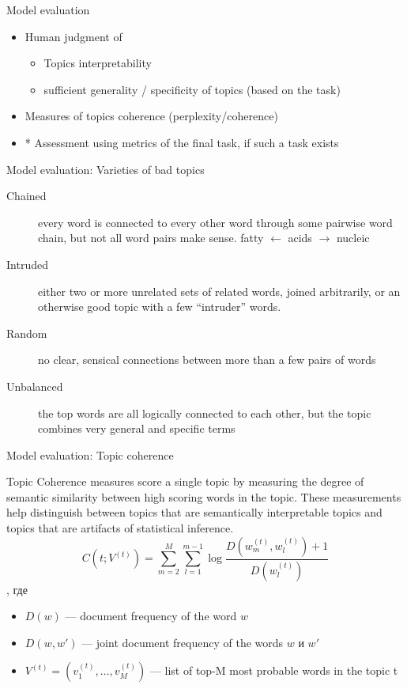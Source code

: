 \documentclass[svgnames]{beamer}
\begin{document}
\begin{frame}{Model evaluation}
\begin{itemize}
\item Human judgment of
\begin{itemize}
\item Topics interpretability
\item sufficient generality / specificity of topics (based on the task)
\end{itemize}
\item Measures of topics coherence (perplexity/coherence)
\item * Assessment using metrics of the final task, if such a task exists
\end{itemize}

\end{frame}

\begin{frame}{Model evaluation: Varieties of bad topics}
\begin{description}
\item[Chained] every word is connected to every other word through
some pairwise word chain, but not all word pairs make sense.
\alert{fatty $\leftarrow$ acids $\rightarrow$ nucleic}
\item[Intruded] either two or more unrelated sets of related words,
joined arbitrarily, or an otherwise good topic with a few
“intruder” words.
\item[Random] no clear, sensical connections between more than a few
pairs of words
\item[Unbalanced] the top words are all logically connected to each
other, but the topic combines very general and specific terms
\end{description}
\end{frame}




\begin{frame}{Model evaluation: Topic coherence}

Topic Coherence measures score a single topic by measuring the degree of semantic similarity between high scoring words in the topic.
These measurements help distinguish between topics that are semantically interpretable topics and topics that are artifacts of statistical inference.
$$
C(t; V^{(t)}) =\sum_{m=2}^{M} \sum_{l=1}^{m-1} \log\frac{D(w_{m}^{(t)},w_{l}^{(t)})+1}{D(w_{l}^{(t)})}
$$, где
\begin{itemize}
\item $D(w)$ — document frequency of the word $w$
\item $D(w,w')$ — joint document frequency of the words $w$ и $w'$
\item $V^{(t)}=(v_1^{(t)},\dots, v_M^{(t)})$ — list of top-M most probable words in the topic t
\end{itemize}
\end{frame}
%
\end{document}
